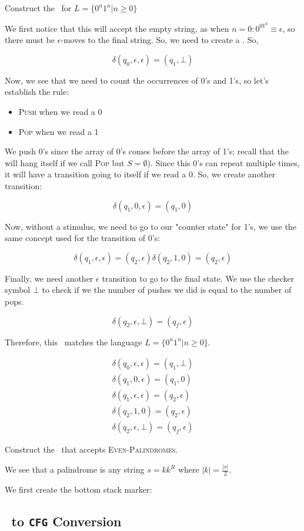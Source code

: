 \begin{ex}
    Construct the \pda\, for $L = \{0^n1^n|n\geq0\}$
\end{ex}

We first notice that this will accept the empty string, as when $n=0:0^01^0\equiv\epsilon$, so there must be $\epsilon$-moves to the final string. So, we need to create a . So,

\[
    \delta(q_0,\epsilon,\epsilon) = (q_1, \bot)
\]


Now, we see that we need to count the occurrences of 0's and 1's, so let's establish the rule:
\begin{itemize}
    \item \textsc{Push} when we read a 0
    \item \textsc{Pop} when we read a 1
\end{itemize}

We push 0's since the array of 0's comes before the array of 1's; recall that the \pda\, will hang itself if we call \textsc{Pop} but $S=\emptyset$). Since this 0's can repeat multiple times, it will have a transition going to itself if we read a 0. So, we create another transition:

\[
    \delta(q_1, 0, \epsilon) = (q_1, 0)
\]

Now, without a stimulus, we need to go to our "counter state" for 1's, we use the same concept used for the transition of 0's:

\[
\delta(q_1, \epsilon, \epsilon) = (q_2, \epsilon)
\delta(q_2, 1, 0) = (q_2, \epsilon)
\]

Finally, we need another $\epsilon$ transition to go to the final state. We use the checker symbol $\bot$ to check if we the number of pushes we did is equal to the number of pops.

\[
\delta(q_2, \epsilon, \bot) = (q_f, \epsilon)
\]

Therefore, this \pda\, matches the language $L=\{0^n1^n|n\geq0\}$.

\begin{align*}
    \delta(q_0,\epsilon,\epsilon) = (q_1, \bot)  \\ 
    \delta(q_1, 0, \epsilon) = (q_1, 0) \\ 
    \delta(q_1, \epsilon, \epsilon) = (q_2, \epsilon) \\ 
    \delta(q_2, 1, 0) = (q_2, \epsilon) \\ 
    \delta(q_2, \epsilon, \bot) = (q_f, \epsilon)
\end{align*}

\begin{ex}
    Construct the \pda\, that accepts \textsc{Even-Palindromes}.
\end{ex}

We see that a palindrome is any string $s=kk^R$ where $|k|=\frac{|s|}{2}$.

We first create the bottom stack marker:

\subsection{\pda\, to \texttt{CFG} Conversion}